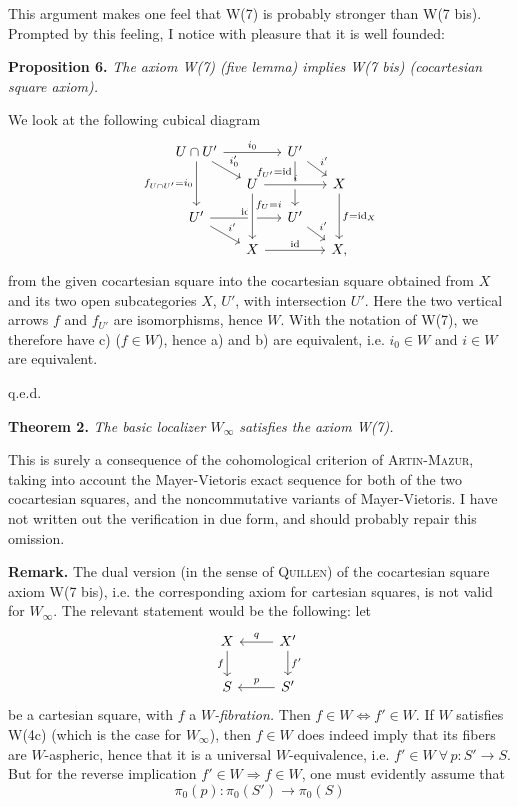 \documentclass[11pt]{article}
\newcommand{\printedpage}[1]{\marginpar{\footnotesize p.~#1}}
\newcommand{\msp}[1]{\marginpar{\footnotesize [#1]}}
\begin{document}
This argument makes one feel that W(7) is probably stronger than W(7 bis). Prompted by this feeling, I notice with pleasure that it is well founded:

\printedpage{57}

\msp{page 78}
\textbf{Proposition 6.} \textit{The axiom \textup{W(7)} (five lemma) implies \textup{W(7 bis)} (cocartesian square axiom).}

We look at the following cubical diagram
\[
\begin{tikzcd}[row sep=small, column sep=small]
U\cap U' \arrow[rr, "i_0"] \arrow[dr, "i'_0"] \arrow[dd, "f_{U\cap U'}=i_0"'] & & U' \arrow[dr, "i'"] \arrow[dd, "f_{U'}=\mathrm{id}"{swap,pos=.25}] & \\
& U \arrow[rr, crossing over, "i"] & & X \arrow[dd, "f=\mathrm{id}_X"] \\
U' \arrow[rr, "\mathrm{id}"] \arrow[dr, "i'"] & & U' \arrow[dr, "i'"] & \\
& X \arrow[rr, "\mathrm{id}"] \arrow[from=uu, crossing over, "f_U=i"{pos=.25}] & & X,
\end{tikzcd}
\]
from the given cocartesian square into the cocartesian square obtained from $X$ and its two open subcategories $X$, $U'$, with intersection $U'$. Here the two vertical arrows $f$ and $f_{U'}$ are isomorphisms, hence $W$. With the notation of W(7), we therefore have c) ($f\in W$), hence a) and b) are equivalent, i.e. $i_0\in W$ and $i\in W$ are equivalent.

\hfill q.e.d.

\textbf{Theorem 2.} \textit{The basic localizer $W_\infty$ satisfies the axiom \textup{W(7)}.}

This is surely a consequence of the cohomological criterion of \textsc{Artin-Mazur}, taking into account the Mayer-Vietoris exact sequence for both of the two cocartesian squares, and the noncommutative variants of Mayer-Vietoris. I have not written out the verification in due form, and should probably repair this omission.

\msp{page 79}
\textbf{Remark.} The dual version (in the sense of \textsc{Quillen}) of the cocartesian square axiom W(7 bis), i.e. the corresponding axiom for cartesian squares, is not valid for $W_\infty$. The relevant statement would be the following: let
\[
\begin{tikzcd}
X & X' \arrow[l, "q"'] \arrow[d, "f'"] \\
S & S' \arrow[l, "p"']
\arrow[from=1-1, to=2-1, "f"']
\end{tikzcd}
\]
be a cartesian square, with $f$ a \textit{$W$-fibration.} Then $f\in W\Longleftrightarrow f'\in W$. If $W$ satisfies W(4c) (which is the case for $W_\infty$), then $f\in W$ does indeed imply that its fibers are $W$-aspheric, hence that it is a universal $W$-equivalence, i.e. $f'\in W\ \forall\, p:S'\longrightarrow S$. But for the reverse implication $f'\in W\Longrightarrow f\in W$, one must evidently assume that
\[
\pi_0(p):\pi_0(S')\longrightarrow\pi_0(S)
\]
\end{document}
